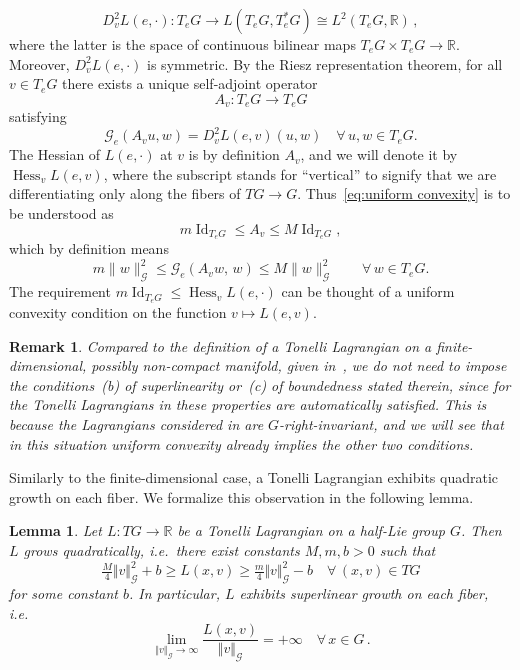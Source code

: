 \documentclass[11pt,reqno]{amsart}
\theoremstyle{plain}
\newtheorem{lem}[thm]{Lemma}
\newtheorem{rem}[thm]{Remark}
\theoremstyle{definition}
\theoremstyle{plain} %
\newtheorem{lem}[lem]{Lemma}
\newtheorem{rem}[rem]{Remark}
\theoremstyle{definition} %
\numberwithin{equation}{section}
\def\G{\mathcal{G}}
\def\RR{{\mathbb R}}
\begin{document}
\[
 D^2_v L(e, \cdot) \colon T_e G \to L(T_e G, T_e^* G) \cong L^2(T_e G, \mathbb{R}) \, ,
\]
where the latter is the space of continuous bilinear maps \( T_e G \times T_e G \to \mathbb{R} \). 
Moreover, \( D^2_v L(e, \cdot) \) is symmetric. 
By the Riesz representation theorem, for all \( v \in T_e G \) there exists a unique self-adjoint operator 
\[
 A_v \colon T_e G \to T_e G
\]
satisfying
\begin{equation*}
    \mathcal{G}_e( A_v u, w ) = D^2_v L(e, v)(u, w) \quad \forall\, u, w \in T_e G.
\end{equation*}
The Hessian of \( L(e, \cdot) \) at \( v \) is by definition \( A_v \), 
and we will denote it by \( \operatorname{Hess}_v L (e, v) \), 
where the subscript stands for \enquote{vertical} to signify that we are differentiating only along the fibers of \( TG \to G \). 
Thus~\eqref{eq:uniform convexity} is to be understood as
\[
 m \operatorname{Id}_{T_eG} \leq A_v \leq M \operatorname{Id}_{T_{e}G},
\]
which by definition means
\[
 m \| w \|^2_{\mathcal G} \leq \G_e(A_v w,\, w) \leq M \| w \|_{\G}^2
 \qquad \forall\, w \in T_e G.
\]
The requirement \( m \operatorname{Id}_{T_eG} \leq \operatorname{Hess}_v L (e, \cdot) \) can be thought of a uniform convexity condition on the function \( v \mapsto L(e, v) \).
\begin{rem}
Compared to the definition of a Tonelli Lagrangian on a finite-dimensional, possibly non-compact manifold, given in~\cite[§1.1]{ContrerasIturriaga1999}, we do not need to impose the conditions~(b) of superlinearity or~(c) of boundedness stated therein, since for the Tonelli Lagrangians in  these properties are automatically satisfied.
 This is because the Lagrangians considered in  are $G$-right-invariant, and we will see that in this situation uniform convexity already implies the other two conditions. 
\end{rem} 

Similarly to the finite-dimensional case, a Tonelli Lagrangian exhibits quadratic growth on each fiber. We formalize this observation in the following lemma.
\begin{lem}\label{Ilem: Tonelli Langrangians}
    Let $L:TG \to \RR$ be a Tonelli Lagrangian on a half-Lie group $G$. Then \( L \) grows  quadratically, i.e.\ there exist constants \( M, m, b > 0 \) such that
        \begin{equation}\label{eq: quadratic growth of Tonelli langrang on half lie groups}
          \tfrac{M}{4} \Vert v\Vert_{\G}^2 + b\geq  L(x,v) \geq \tfrac{m}{4} \Vert v\Vert_{\G}^2 - b \quad \forall\, (x,v)\in TG
        \end{equation}
        for some constant \( b \).
        In particular, $L$ exhibits superlinear growth on each fiber, i.e.\ 
        \[
            \lim_{\Vert v\Vert_{\G}\to \infty} \frac{L(x,v)}{\Vert v\Vert_{\G}} = +\infty 
            \quad \forall\, x \in G\, .
        \]
\end{lem}
\end{document}
